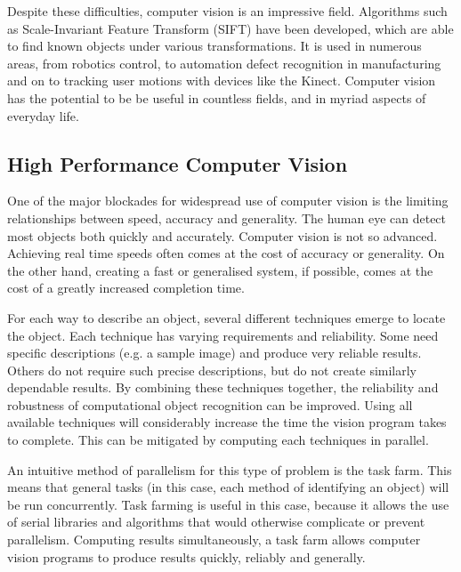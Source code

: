 \documentclass[../main.tex]{subfiles}
\begin{document}
    Despite these difficulties, computer vision is an impressive field.
    Algorithms such as Scale-Invariant Feature Transform (SIFT)\cite{sift} have been developed, which are able to find known objects under various transformations.
    It is used in numerous areas, from robotics control, to automation defect recognition in manufacturing and on to tracking user motions with devices like the Kinect.
    Computer vision has the potential to be be useful in countless fields, and in myriad aspects of everyday life.


    \subsection{High Performance Computer Vision}
    One of the major blockades for widespread use of computer vision is the limiting relationships between speed, accuracy and generality.
    The human eye can detect most objects both quickly and accurately.
    Computer vision is not so advanced.
    Achieving real time speeds often comes at the cost of accuracy or generality.
    On the other hand, creating a fast or generalised system, if possible, comes at the cost of a greatly increased completion time.
    
    For each way to describe an object, several different techniques emerge to locate the object.
    Each technique has varying requirements and reliability.
    Some need specific descriptions (e.g. a sample image) and produce very reliable results.
    Others do not require such precise descriptions, but do not create similarly dependable results.
    By combining these techniques together, the reliability and robustness of computational object recognition can be improved.
    Using all available techniques will considerably increase the time the vision program takes to complete.
    This can be mitigated by computing each techniques in parallel.

    An intuitive method of parallelism for this type of problem is the task farm.
    This means that general tasks (in this case, each method of identifying an object) will be run concurrently.
    Task farming is useful in this case, because it allows the use of serial libraries and algorithms that would otherwise complicate or prevent parallelism.
    Computing results simultaneously, a task farm allows computer vision programs to produce results quickly, reliably and generally.
\end{document}
